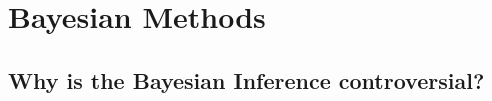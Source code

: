 \documentclass[c, dvipsnames]{beamer}  %
\begin{document}
\section{Bayesian Methods}





\subsection{Why is the Bayesian Inference controversial?}

%
%  
%
%
%  
%
%  
%
%
%
%
%


%
%
%
%	
%
%
%
\end{document}
